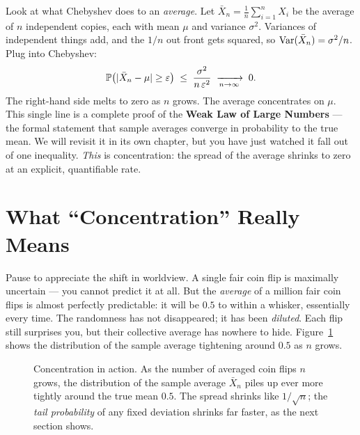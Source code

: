 \begin{happeningbox}
Look at what Chebyshev does to an \emph{average}. Let
$\bar X_n = \frac1n\sum_{i=1}^n X_i$ be the average of $n$ independent copies,
each with mean $\mu$ and variance $\sigma^2$. Variances of independent things
add, and the $1/n$ out front gets squared, so
$\operatorname{Var}(\bar X_n) = \sigma^2/n$. Plug into Chebyshev:
\[
  \operatorname{\mathbb{P}}\bigl(\lvert\bar X_n - \mu\rvert \ge \varepsilon\bigr)
  \;\le\; \frac{\sigma^2}{n\,\varepsilon^2}
  \;\xrightarrow[n\to\infty]{}\; 0.
\]
The right-hand side melts to zero as $n$ grows. The average concentrates on
$\mu$. This single line is a complete proof of the \textbf{Weak Law of Large
Numbers} --- the formal statement that sample averages converge in
probability to the true mean. We will revisit it in its own chapter, but you
have just watched it fall out of one inequality. \emph{This} is concentration:
the spread of the average shrinks to zero at an explicit, quantifiable rate.
\end{happeningbox}

\section{What ``Concentration'' Really Means}
\label{ch19:concentration}

Pause to appreciate the shift in worldview. A single fair coin flip is maximally
uncertain --- you cannot predict it at all. But the \emph{average} of a million
fair coin flips is almost perfectly predictable: it will be $0.5$ to within a
whisker, essentially every time. The randomness has not disappeared; it has
been \emph{diluted}. Each flip still surprises you, but their collective
average has nowhere to hide. Figure~\ref{ch19:fig-concentration} shows the
distribution of the sample average tightening around $0.5$ as $n$ grows.

\begin{figure}[H]
\centering
{}
\caption{Concentration in action. As the number of averaged coin flips $n$
grows, the distribution of the sample average $\bar X_n$ piles up ever more
tightly around the true mean $0.5$. The spread shrinks like $1/\sqrt n$; the
\emph{tail probability} of any fixed deviation shrinks far faster, as the next
section shows.}
\label{ch19:fig-concentration}
\end{figure}

